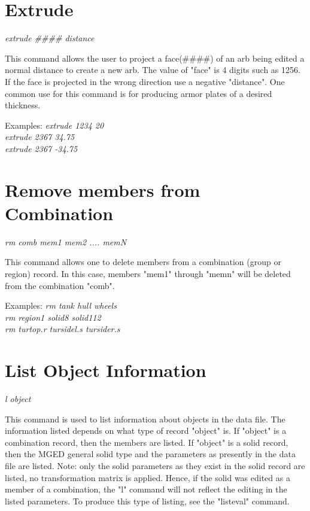 \section{Extrude}

{\em \center
extrude \#\#\#\# distance
}

This command allows the user to project
a face(\#\#\#\#) of an arb being edited a normal distance to create a new arb.
The value of "face" is 4 digits such as 1256. If the face is projected
in the wrong direction use a negative "distance".
One common use for this command is
for producing armor plates of a desired thickness.

Examples:
{\em
              extrude 1234 20 \\
              extrude 2367 34.75 \\
              extrude 2367 -34.75 \\
}

\section{Remove members from Combination}

{\em \center
rm comb mem1 mem2 .... memN
}

This command allows one to delete members from a combination (group or region) record.
In this case, members "mem1" through "memn" will be deleted from
the combination "comb".

Examples:
{\em
              rm tank hull wheels \\
              rm region1 solid8 solid112 \\
              rm turtop.r tursidel.s tursider.s  \\
}

\section{List Object Information}

{\em \center
l object
}

This command is used to list information about objects in the data file.
The information listed depends on what type of record "object" is.
If "object" is a combination record, then the members are listed.
If "object" is a solid record, then the MGED general solid type and
the parameters as presently in the data file are listed.
Note:  only the solid parameters as they exist in the solid record are
listed, no transformation matrix is applied.
Hence, if the solid was edited as a member of a combination, the "l"
command will not reflect the editing in the listed parameters.
To produce this type of listing, see the "listeval" command.

